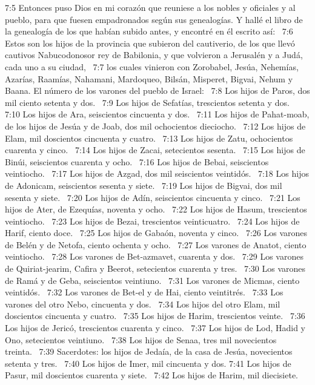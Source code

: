 7:5 Entonces puso Dios en mi corazón que reuniese a los nobles y oficiales y al pueblo, para que fuesen empadronados según sus genealogías. Y hallé el libro de la genealogía de los que habían subido antes, y encontré en él escrito así:  
7:6 Estos son los hijos de la provincia que subieron del cautiverio, de los que llevó cautivos Nabucodonosor rey de Babilonia, y que volvieron a Jerusalén y a Judá, cada uno a su ciudad,  
7:7 los cuales vinieron con Zorobabel, Jesúa, Nehemías, Azarías, Raamías, Nahamani, Mardoqueo, Bilsán, Misperet, Bigvai, Nehum y Baana. El número de los varones del pueblo de Israel:  
7:8 Los hijos de Paros, dos mil ciento setenta y dos.  
7:9 Los hijos de Sefatías, trescientos setenta y dos.  
7:10 Los hijos de Ara, seiscientos cincuenta y dos.  
7:11 Los hijos de Pahat-moab, de los hijos de Jesúa y de Joab, dos mil ochocientos dieciocho.  
7:12 Los hijos de Elam, mil doscientos cincuenta y cuatro.  
7:13 Los hijos de Zatu, ochocientos cuarenta y cinco.  
7:14 Los hijos de Zacai, setecientos sesenta.  
7:15 Los hijos de Binúi, seiscientos cuarenta y ocho.  
7:16 Los hijos de Bebai, seiscientos veintiocho.  
7:17 Los hijos de Azgad, dos mil seiscientos veintidós.  
7:18 Los hijos de Adonicam, seiscientos sesenta y siete.  
7:19 Los hijos de Bigvai, dos mil sesenta y siete.  
7:20 Los hijos de Adín, seiscientos cincuenta y cinco.  
7:21 Los hijos de Ater, de Ezequías, noventa y ocho.  
7:22 Los hijos de Hasum, trescientos veintiocho.  
7:23 Los hijos de Bezai, trescientos veinticuatro.  
7:24 Los hijos de Harif, ciento doce.  
7:25 Los hijos de Gabaón, noventa y cinco.  
7:26 Los varones de Belén y de Netofa, ciento ochenta y ocho.  
7:27 Los varones de Anatot, ciento veintiocho.  
7:28 Los varones de Bet-azmavet, cuarenta y dos.  
7:29 Los varones de Quiriat-jearim, Cafira y Beerot, setecientos cuarenta y tres.  
7:30 Los varones de Ramá y de Geba, seiscientos veintiuno.  
7:31 Los varones de Micmas, ciento veintidós.  
7:32 Los varones de Bet-el y de Hai, ciento veintitrés.  
7:33 Los varones del otro Nebo, cincuenta y dos.  
7:34 Los hijos del otro Elam, mil doscientos cincuenta y cuatro.  
7:35 Los hijos de Harim, trescientos veinte.  
7:36 Los hijos de Jericó, trescientos cuarenta y cinco.  
7:37 Los hijos de Lod, Hadid y Ono, setecientos veintiuno.  
7:38 Los hijos de Senaa, tres mil novecientos treinta.  
7:39 Sacerdotes: los hijos de Jedaía, de la casa de Jesúa, novecientos setenta y tres.  
7:40 Los hijos de Imer, mil cincuenta y dos. 
7:41 Los hijos de Pasur, mil doscientos cuarenta y siete.  
7:42 Los hijos de Harim, mil diecisiete.  
